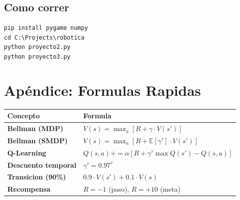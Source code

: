 \documentclass[11pt,a4paper]{article}
\begin{document}
\subsection{Como correr}

\begin{lstlisting}
pip install pygame numpy
cd C:\Projects\robotica
python proyecto2.py
python proyecto3.py
\end{lstlisting}


\newpage
\section{Apéndice: Formulas Rapidas}

\begin{center}
\begin{tabular}{>{\bfseries}l l}
\toprule
\rowcolor{tabheader}
Concepto & Formula \\
\midrule
Bellman (MDP) & $V(s) = \max_a [R + \gamma \cdot V(s')]$ \\
Bellman (SMDP) & $V(s) = \max_a [R + \mathbb{E}[\gamma^\tau] \cdot V(s')]$ \\
Q-Learning & $Q(s,a) += \alpha [R + \gamma^\tau \max Q(s') - Q(s,a)]$ \\
Descuento temporal & $\gamma^\tau = 0.97^\tau$ \\
Transicion (90\%) & $0.9 \cdot V(s') + 0.1 \cdot V(s)$ \\
Recompensa & $R = -1$ (paso), $R = +10$ (meta) \\
\bottomrule
\end{tabular}
\end{center}
\end{document}
